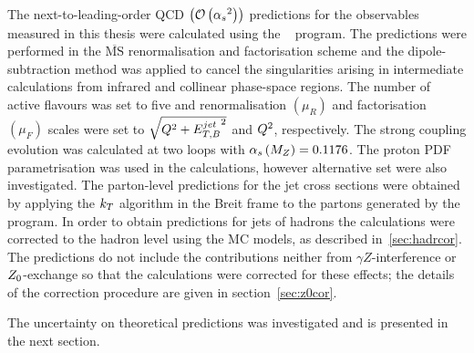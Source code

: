 The next-to-leading-order QCD $ \left( \mathcal{O}\left( \mbox{$\alpha_{s}$}^2\right) \right) $ predictions for the observables measured in this thesis were calculated using the \nlojet~\cite{nlojet++} program. The predictions were performed in the $\overline{\text{MS}}$ renormalisation and factorisation scheme and the dipole-subtraction method was applied to cancel the singularities arising in intermediate calculations from infrared and collinear phase-space regions. The number of active flavours was set to five and renormalisation $\left( \mu_R \right) $ and factorisation $\left( \mu_F \right) $ scales were set to $\sqrt{Q^2+\mbox{$E_{T,B}^{jet}$}^2}$ and $\mbox{${Q^2}$}$, respectively. The strong coupling evolution was calculated at two loops with $\mbox{$\alpha_{s}\left(M_{Z}\right)$}=0.1176$. The  proton PDF parametrisation was used in the calculations, however alternative set were also investigated. The parton-level predictions for the jet cross sections were obtained by applying the $\mbox{$k_{T}$}$ algorithm in the Breit frame to the partons generated by the program. In order to obtain predictions for jets of hadrons the calculations were corrected to the hadron level using the MC models, as described in~\ref{sec:hadrcor}. The predictions do not include the contributions neither from $\gamma Z$-interference or $\mbox{$Z_0$}$-exchange so that the calculations were corrected for these effects; the details of the correction procedure are given in section~\ref{sec:z0cor}. 

The uncertainty on theoretical predictions was investigated and is presented in the next section.